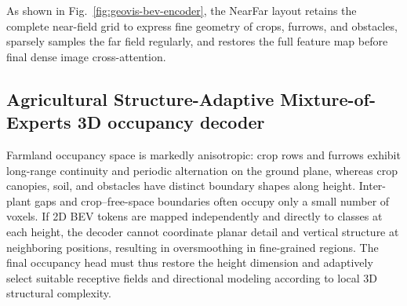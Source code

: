\documentclass[a4paper,fleqn]{cas-sc}
\begin{document}
As shown in Fig.~\ref{fig:geovis-bev-encoder}, the NearFar layout retains the complete near-field grid to express fine geometry of crops, furrows, and obstacles, sparsely samples the far field regularly, and restores the full feature map before final dense image cross-attention.

\subsection{Agricultural Structure-Adaptive Mixture-of-Experts 3D occupancy decoder}\label{sec:agri-amoe}
Farmland occupancy space is markedly anisotropic: crop rows and furrows exhibit long-range continuity and periodic alternation on the ground plane, whereas crop canopies, soil, and obstacles have distinct boundary shapes along height. Inter-plant gaps and crop--free-space boundaries often occupy only a small number of voxels. If 2D BEV tokens are mapped independently and directly to classes at each height, the decoder cannot coordinate planar detail and vertical structure at neighboring positions, resulting in oversmoothing in fine-grained regions. The final occupancy head must thus restore the height dimension and adaptively select suitable receptive fields and directional modeling according to local 3D structural complexity.
\end{document}
